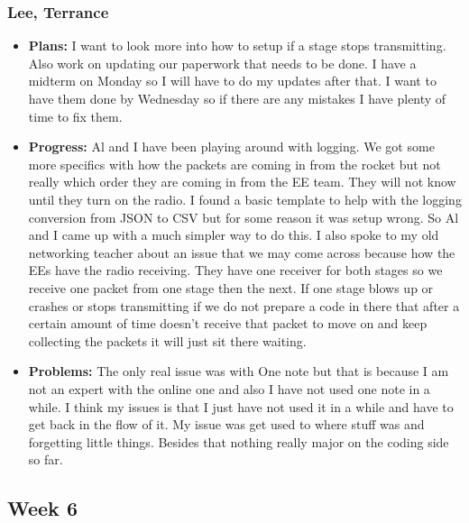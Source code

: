 \documentclass[10pt,draftclsnofoot,onecolumn]{IEEEtran}
\begin{document}
\subsubsection{Lee, Terrance}
\begin{itemize}
	\item \textbf{Plans: }
	I want to look more into how to setup if a stage stops transmitting. Also work on updating our paperwork that needs to be done. I have a midterm on Monday so I will have to do my updates after that. I want to have them done by Wednesday so if there are any mistakes I have plenty of time to fix them.
	\item \textbf{Progress: }
	Al and I have been playing around with logging. We got some more specifics with how the packets are coming in from the rocket but not really which order they are coming in from the EE team. They will not know until they turn on the radio. I found a basic template to help with the logging conversion from JSON to CSV but for some reason it was setup wrong. So Al and I came up with a much simpler way to do this. I also spoke to my old networking teacher about an issue that we may come across because how the EEs have the radio receiving. They have one receiver for both stages so we receive one packet from one stage then the next. If one stage blows up or crashes or stops transmitting if we do not prepare a code in there that after a certain amount of time doesn't receive that packet to move on and keep collecting the packets it will just sit there waiting.
	\item \textbf{Problems: }
	The only real issue was with One note but that is because I am not an expert with the online one and also I have not used one note in a while. I think my issues is that I just have not used it in a while and have to get back in the flow of it. My issue was get used to where stuff was and forgetting little things. Besides that nothing really major on the coding side so far.
\end{itemize}
\subsection{Week 6}
\end{document}
